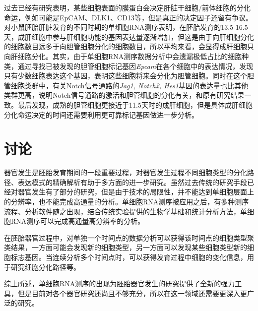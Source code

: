 \documentclass[lang=cn]{elegantpaper}
\begin{document}
过去已经有研究表明，某些细胞表面的膜蛋白会决定肝脏干细胞/前体细胞的分化命运，例如可能是EpCAM、DLK1、CD13\citep{okabe_potential_2009,tanimizu_isolation_2003,kakinuma_analyses_2009}等，但是真正的决定因子还留有争议。对小鼠胚胎肝脏发育的不同时期的单细胞RNA测序表明\citep{su_single-cell_2017}，在胚胎发育的13.5-16.5天，成肝细胞中参与肝细胞功能的基因表达量逐渐增加，但这是由于向肝细胞分化的细胞数目远多于向胆管细胞分化的细胞数目，所以平均来看，会显得成肝细胞只向肝细胞分化。其实，由于单细胞RNA测序数据分析中会遗漏极低占比的细胞种类，\cite{su_single-cell_2017}通过寻找已被发现的胆管细胞标记基因\emph{Epcam}\citep{miyajima_stem/progenitor_2014}在各个细胞中的表达情况，发现只有少数细胞表达这个基因，表明这些细胞将来会分化为胆管细胞。同时在这个胆管细胞类群中，有关Notch信号通路的\emph{Jag1, Notch2, Hes1}基因的表达量也比其他类群更高，说明Notch信号通路的激活和胆管细胞的分化有关，和原有研究结果一致\citep{zong_notch_2009}。最后\cite{su_single-cell_2017}发现，成熟的胆管细胞更接近于11.5天时的成肝细胞，但是具体成肝细胞分化命运决定的时间还需要利用更可靠标记基因做进一步分析。

\section{讨论}
器官发生是胚胎发育期间的一段重要过程，对器官发生过程不同细胞类型的分化路径、表达模式的精确解析有助于多方面的进一步研究。虽然过去传统的研究手段已经对器官发生有了部分的研究，但是由于技术的局限性，并不能达到单细胞层面上的分辨率，也不能完成高通量的分析。单细胞RNA测序被应用之后，有多种测序流程、分析软件随之出现，结合传统实验提供的生物学基础和统计分析方法，单细胞RNA测序可以完成高通量高分辨率的分析。

在胚胎器官过程中，对单独一个时间点的数据分析可以获得该时间点的细胞类型聚类结果，一方面可能会发现新的细胞类型，另一方面可以发现某些细胞类型新的细胞标志基因。当连续分析多个时间点时，可以获得发育过程中细胞的变化信息，用于研究细胞分化路径等。

综上所述，单细胞RNA测序的出现为胚胎器官发生的研究提供了全新的强力工具，但是目前对各个器官研究还尚且不够充分，所以在这一领域还需要更深入更广泛的研究。


\end{document}
